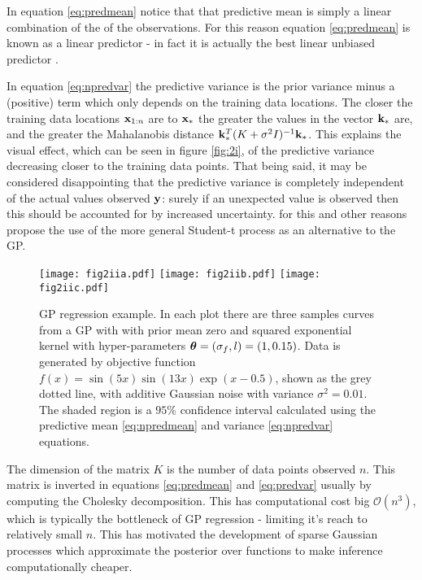 In equation \ref{eq:predmean} notice that that predictive mean is simply a linear combination of the of the observations. For this reason equation \ref{eq:predmean} is known as a linear predictor \cite{rasmussen} - in fact it is actually the best linear unbiased predictor \cite{lectures}.

In equation \ref{eq:npredvar} the predictive variance is the prior variance minus a (positive) term which only depends on the training data locations. The closer the training data locations $\mathbf{x}_{1:n}$ are to $\mathbf{x}_*$ the greater the values in the vector $\mathbf{k}_*$ are, and the greater the Mahalanobis distance $\mathbf{k}_*^T(K + \sigma^2I)^{-1}\mathbf{k}_*$. This explains the visual effect, which can be seen in figure \ref{fig:2i}, of the predictive variance decreasing closer to the training data points. That being said, it may be considered disappointing that the predictive variance is completely independent of the actual values observed $\mathbf{y}$: surely if an unexpected value is observed then this should be accounted for by increased uncertainty. \citet{shah2014student} for this and other reasons propose the use of the more general Student-t process as an alternative to the GP.

\begin{figure}
\centering
\texttt{[image: fig2iia.pdf]}
\texttt{[image: fig2iib.pdf]}
\texttt{[image: fig2iic.pdf]}
\caption{GP regression example. In each plot there are three samples curves from a GP with with prior mean zero and  squared exponential kernel with hyper-parameters $\bm{\theta} = (\sigma_f, l) = (1, 0.15)$. Data is generated by objective function $f(x) = \sin(5x)\sin(13x)\exp(x-0.5)$, shown as the grey dotted line, with additive Gaussian noise with variance $\sigma^2 = 0.01$. The shaded region is a $95\%$ confidence interval calculated using the predictive mean \ref{eq:npredmean} and variance \ref{eq:npredvar} equations.} \label{fig2ii}
\end{figure}

The dimension of the matrix $K$ is the number of data points observed $n$. This matrix is inverted in equations \ref{eq:predmean} and \ref{eq:predvar} usually by computing the Cholesky decomposition. This has computational cost big $\mathcal{O}(n^3)$, which is typically the bottleneck of GP regression - limiting it's reach to relatively small $n$. This has motivated the development of sparse Gaussian processes \cite{quinonero2005unifying} \cite{snelson2006sparse} which approximate the posterior over functions to make inference computationally cheaper.

